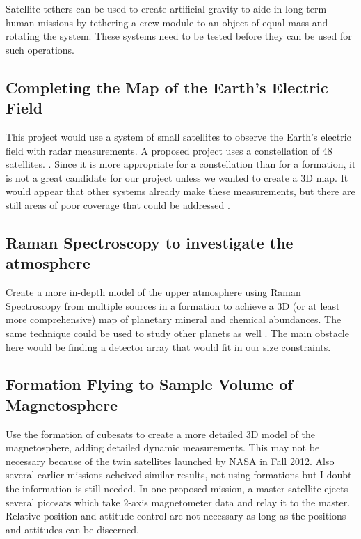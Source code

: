 Satellite tethers can be used to create artificial gravity to aide
in long term human missions by tethering a crew module to an object
of equal mass and rotating the system. These systems need to be tested before they can be used for such operations. \cite{Ref:Carlson}\cite{Ref:Mazzoleni}

\subsection{Completing the Map of the Earth's Electric Field}

This project would use a system of small satellites to observe the
Earth's electric field with radar measurements. A proposed project
uses a constellation of 48 satellites. \cite{Ref:Redd}. Since it
is more appropriate for a constellation than for a formation, it is
not a great candidate for our project unless we wanted to create a
3D map. It would appear that other systems already make these measurements, but there are still areas of poor coverage that could be addressed \cite{Ref:ElecMap}. 

\subsection{Raman Spectroscopy to investigate the atmosphere}

Create a more in-depth model of the upper atmosphere using Raman Spectroscopy from multiple sources in a formation to achieve a 3D (or at least more comprehensive) map of planetary mineral and chemical abundances. The same technique could be used to study other planets as well \cite{Ref:Cantrell}. The main obstacle here would be finding a detector array that would fit in our size constraints. 

\subsection{Formation Flying to Sample Volume of Magnetosphere}

Use the formation of cubesats to create a more detailed 3D model of
the magnetosphere, adding detailed dynamic measurements. This may
not be necessary because of the twin satellites launched by NASA in
Fall 2012. Also several earlier missions acheived similar results,
not using formations but I doubt the information is still needed.\cite{Ref:Mag3D} In one proposed mission, a master satellite ejects several picosats which take 2-axis magnetometer data and relay it to the master. Relative position and attitude control are not necessary as long as the positions and attitudes can be discerned.\cite{Ref:Clarke}